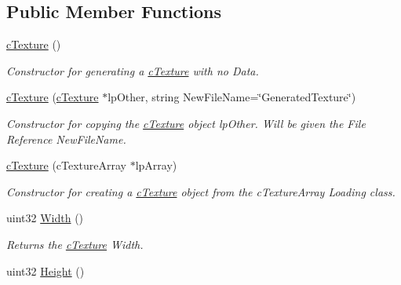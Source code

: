 \subsection*{Public Member Functions}
\begin{DoxyCompactItemize}
\item 
\hypertarget{classc_texture_a9c2cfe21558d59e5118ca578d2a78393}{
\hyperlink{classc_texture_a9c2cfe21558d59e5118ca578d2a78393}{cTexture} ()}
\label{classc_texture_a9c2cfe21558d59e5118ca578d2a78393}

\begin{DoxyCompactList}\small\item\em Constructor for generating a \hyperlink{classc_texture}{cTexture} with no Data. \end{DoxyCompactList}\item 
\hypertarget{classc_texture_af622516c2733fb7b131fad936cc1791f}{
\hyperlink{classc_texture_af622516c2733fb7b131fad936cc1791f}{cTexture} (\hyperlink{classc_texture}{cTexture} $\ast$lpOther, string NewFileName=\char`\"{}GeneratedTexture\char`\"{})}
\label{classc_texture_af622516c2733fb7b131fad936cc1791f}

\begin{DoxyCompactList}\small\item\em Constructor for copying the \hyperlink{classc_texture}{cTexture} object lpOther. Will be given the File Reference NewFileName. \end{DoxyCompactList}\item 
\hypertarget{classc_texture_a0caaa555739681b8beca2cf27e2f5073}{
\hyperlink{classc_texture_a0caaa555739681b8beca2cf27e2f5073}{cTexture} (cTextureArray $\ast$lpArray)}
\label{classc_texture_a0caaa555739681b8beca2cf27e2f5073}

\begin{DoxyCompactList}\small\item\em Constructor for creating a \hyperlink{classc_texture}{cTexture} object from the cTextureArray Loading class. \end{DoxyCompactList}\item 
\hypertarget{classc_texture_affc7cdbd5fc8163c96d2a189724d4f35}{
uint32 \hyperlink{classc_texture_affc7cdbd5fc8163c96d2a189724d4f35}{Width} ()}
\label{classc_texture_affc7cdbd5fc8163c96d2a189724d4f35}

\begin{DoxyCompactList}\small\item\em Returns the \hyperlink{classc_texture}{cTexture} Width. \end{DoxyCompactList}\item 
\hypertarget{classc_texture_a1a6b4f4c5dccb2394f77c25c063e1fe0}{
uint32 \hyperlink{classc_texture_a1a6b4f4c5dccb2394f77c25c063e1fe0}{Height} ()}
\label{classc_texture_a1a6b4f4c5dccb2394f77c25c063e1fe0}


\end{DoxyCompactItemize}
